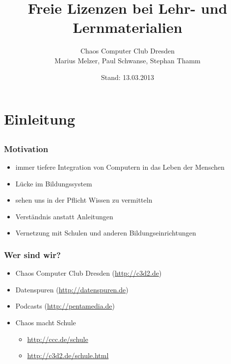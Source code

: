\documentclass{beamer}
\title{Freie Lizenzen bei Lehr- und Lernmaterialien}
\author{Chaos Computer Club Dresden\\Marius Melzer, Paul Schwanse, Stephan Thamm}
\date{Stand: 13.03.2013}
\begin{document}
\maketitle

\frame{\tableofcontents[hideallsubsections]}

\section{Einleitung}
\subsection{}

\begin{frame}
    \frametitle{Motivation}
    \begin{itemize}
        \item<2-> immer tiefere Integration von Computern in das Leben der Menschen
        \item<3-> Lücke im Bildungssystem
        \item<4-> sehen uns in der Pflicht Wissen zu vermitteln
        \item<5-> Verständnis anstatt Anleitungen
        \item<6-> Vernetzung mit Schulen und anderen Bildungseinrichtungen
    \end{itemize}
\end{frame}

\begin{frame}
    \frametitle{Wer sind wir?}
    \begin{itemize}
        \item<2-> Chaos Computer Club Dresden (\url{http://c3d2.de})
            \note{}
        \item<3-> Datenspuren (\url{http://datenspuren.de})
        \item<4-> Podcasts (\url{http://pentamedia.de})
        \item<5-> Chaos macht Schule
            \begin{itemize}
                \item<2-> \url{http://ccc.de/schule}
                \item<2-> \url{http://c3d2.de/schule.html}
            \end{itemize}
    \end{itemize}
\end{frame}
\end{document}
